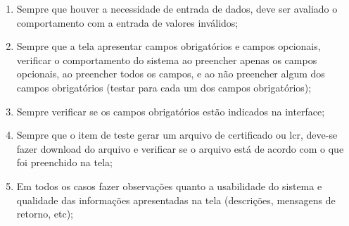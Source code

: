 \begin{enumerate}
 \item Sempre que houver a necessidade de entrada de dados, deve ser avaliado o comportamento com a entrada de valores inválidos;
 \item Sempre que a tela apresentar campos obrigatórios e campos opcionais, verificar o comportamento do sistema ao preencher apenas os campos opcionais, ao preencher todos os campos, e ao não preencher algum dos campos obrigatórios (testar para cada um dos campos obrigatórios);
 \item Sempre verificar se os campos obrigatórios estão indicados na interface;
 \item Sempre que o item de teste gerar um arquivo de certificado ou lcr, deve-se fazer download do arquivo e verificar se o arquivo está de acordo com o que foi preenchido na tela;
 \item Em todos os casos fazer observações quanto a usabilidade do sistema e qualidade das informações apresentadas na tela (descrições, mensagens de retorno, etc);
\end{enumerate}